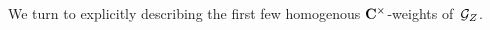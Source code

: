 We turn to explicitly describing the first few homogenous $\mathbf{C}^\times$-weights of~$\mathcal G_Z$. 


%
%
%


